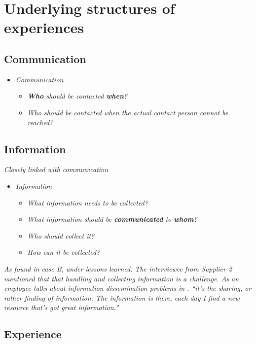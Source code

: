 \section{Underlying structures of experiences}
\label{sec:discussionStructures}
\subsection{Communication}
\begin{itemize}
\item \textit{Communication}
\begin{itemize}
\item \textit{\textbf{Who} should be contacted \textbf{when}?}
\item \textit{Who should be contacted when the actual contact person cannot be reached?}
\end{itemize}
\end{itemize}

\subsection{Information}
\textit{Closely linked with communication}

\begin{itemize}
\item \textit{Information}
\begin{itemize}
\item \textit{What information needs to be collected?}
\item \textit{What information should be \textbf{communicated} to \textbf{whom}?}
\item \textit{Who should collect it?}
\item \textit{How can it be collected?}
\end{itemize}
\end{itemize}

\textit{As found in case B, under lessons learned:
The interviewee from Supplier 2 mentioned that that handling and collecting information is a challenge. As an employee talks about information dissemination problems in \cite{ahmad2012incident}.
``it's the sharing, or rather finding of information. The information is there, each day I find a new resource that's got great information."}

\subsection{Experience}

